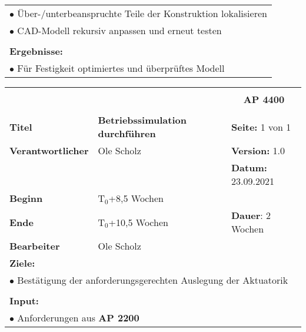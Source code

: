 \begin{table}[!h]
\begin{center}
\begin{tabular}{|p{35mm}||p{55mm}|p{50mm}||p{40mm}|}
			\multicolumn{4}{|p{150mm}|}{$\bullet$ Über-/unterbeanspruchte Teile der Konstruktion lokalisieren}\\
			\multicolumn{4}{|p{150mm}|}{$\bullet$ CAD-Modell rekursiv anpassen und erneut testen}\\
			\multicolumn{4}{|p{150mm}|}{}\\
			\multicolumn{4}{|p{150mm}|}{\textbf{Ergebnisse:}}\\
			\multicolumn{4}{|p{150mm}|}{$\bullet$ Für Festigkeit optimiertes und überprüftes Modell}\\
			\hline
		\end{tabular}
	\end{center}
\end{table}

\clearpage
\begin{table}[!h]
	\begin{center}
		\begin{tabular}{|p{35mm}||p{55mm}|p{50mm}||p{40mm}|}
			\hline
			\multicolumn{3}{|l||}{\textbf{}} & \multicolumn{1}{c|}{}\\
			\multicolumn{3}{|l||}{\textbf{}} & \multicolumn{1}{c|}{\textbf{AP 4400}}\\
			\multicolumn{3}{|l||}{\textbf{}} & \multicolumn{1}{c|}{}\\
			\hline\hline
			\textbf{Titel} & \multicolumn{2}{p{7cm}||}{\textbf{Betriebssimulation durchführen}} 
			& \textbf{Seite:} 1 von 1\\
			\hline
			\textbf{Verantwortlicher} & \multicolumn{2}{l||}{Ole Scholz} & \textbf{Version:} 1.0\\
			\hline
			\multicolumn{3}{|l||}{} & \textbf{Datum:} 23.09.2021\\
			\hline\hline
			\textbf{Beginn} & \multicolumn{2}{l||}{T$_0$+8,5 Wochen} & \\
			\hline
			\textbf{Ende} & \multicolumn{2}{l||}{T$_0$+10,5 Wochen} & \textbf{Dauer}: 2 Wochen\\
			\hline\hline
			\textbf{Bearbeiter} & \multicolumn{3}{l|}{Ole Scholz}\\
			\hline\hline
			\multicolumn{4}{|p{150mm}|}{\textbf{Ziele:}}\\
			\multicolumn{4}{|p{150mm}|}{$\bullet$ Bestätigung der anforderungsgerechten Auslegung der Aktuatorik}\\
			\multicolumn{4}{|p{150mm}|}{}\\
			\multicolumn{4}{|p{150mm}|}{\textbf{Input:}}\\
			\multicolumn{4}{|p{150mm}|}{$\bullet$ Anforderungen aus \textbf{AP 2200}}\\

\end{tabular}
\end{center}
\end{table}
